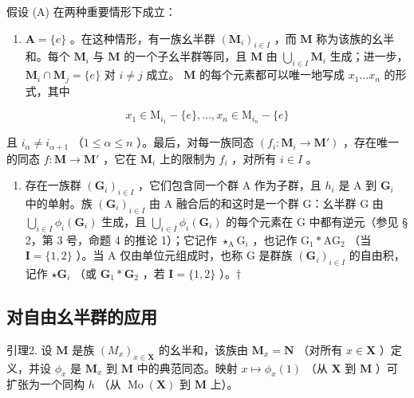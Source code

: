 假设 (A) 在两种重要情形下成立：

\begin{enumerate}
\def\labelenumi{(\alph{enumi})}
\tightlist
\item
  \(\mathbf{A} = \{e\}\) 。在这种情形，有一族幺半群 \((\mathbf{M}_i)_{i\in I}\) ，而 \(\mathbf{M}\) 称为该族的幺半和。每个 \(\mathbf{M}_i\) 与 \(\mathbf{M}\) 的一个子幺半群等同，且 \(\mathbf{M}\) 由 \(\bigcup_{i\in I}\mathbf{M}_i\) 生成；进一步，\(\mathbf{M}_i\cap \mathbf{M}_j = \{e\}\) 对 \(i\neq j\) 成立。 \(\mathbf{M}\) 的每个元素都可以唯一地写成 \(x_{1}\ldots x_{n}\) 的形式，其中
\end{enumerate}

\[
x _ {1} \in \mathrm{M} _ {i _ {1}} - \{e \}, \dots , x _ {n} \in \mathrm{M} _ {i _ {n}} - \{e \}
\]

且 \(i_{\alpha} \neq i_{\alpha + 1}\) （\(1 \leqslant \alpha \leqslant n\) ）。最后，对每一族同态 \((f_i: \mathbf{M}_i \to \mathbf{M}')\) ，存在唯一的同态 \(f: \mathbf{M} \to \mathbf{M}'\) ，它在 \(\mathbf{M}_i\) 上的限制为 \(f_i\) ，对所有 \(i \in I\) 。

\begin{enumerate}
\def\labelenumi{(\alph{enumi})}
\setcounter{enumi}{1}
\tightlist
\item
  存在一族群 \((\mathbf{G}_i)_{i\in I}\) ，它们包含同一个群 A 作为子群，且 \(h_i\) 是 A 到 \(\mathbf{G}_i\) 中的单射。族 \((\mathbf{G}_i)_{i\in I}\) 由 A 融合后的和这时是一个群 G：幺半群 G 由 \(\bigcup_{i\in I}\phi_i(\mathbf{G}_i)\) 生成，且 \(\bigcup_{i\in I}\phi_i(\mathbf{G}_i)\) 的每个元素在 G 中都有逆元（参见 § 2，第 3 号，命题 4 的推论 1）；它记作 \(\star_{\mathrm{A}}\mathrm{G}_{i}\) ，也记作 \(\mathrm{G}_{1}*\mathrm{A}\mathrm{G}_{2}\) （当 \(\mathbf{I} = \{1,2\}\) ）。当 A 仅由单位元组成时，也称 G 是群族 \((\mathbf{G}_i)_{i\in I}\) 的自由积，记作 \(\star \mathbf{G}_i\) （或 \(\mathbf{G}_1*\mathbf{G}_2\) ，若 \(\mathbf{I} = \{1,2\}\) ）。†
\end{enumerate}

\subsection{对自由幺半群的应用}

引理2. 设 \(\mathbf{M}\) 是族 \((M_x)_{x\in \mathbf{X}}\) 的幺半和，该族由 \(\mathbf{M}_x = \mathbf{N}\) （对所有 \(x\in \mathbf{X}\) ）定义，并设 \(\phi_{x}\) 是 \(\mathbf{M}_x\) 到 \(\mathbf{M}\) 中的典范同态。映射 \(x\mapsto \phi_x(1)\) （从 \(\mathbf{X}\) 到 \(\mathbf{M}\) ）可扩张为一个同构 \(h\) （从 \(\operatorname {Mo}(\mathbf{X})\) 到 \(\mathbf{M}\) 上）。

